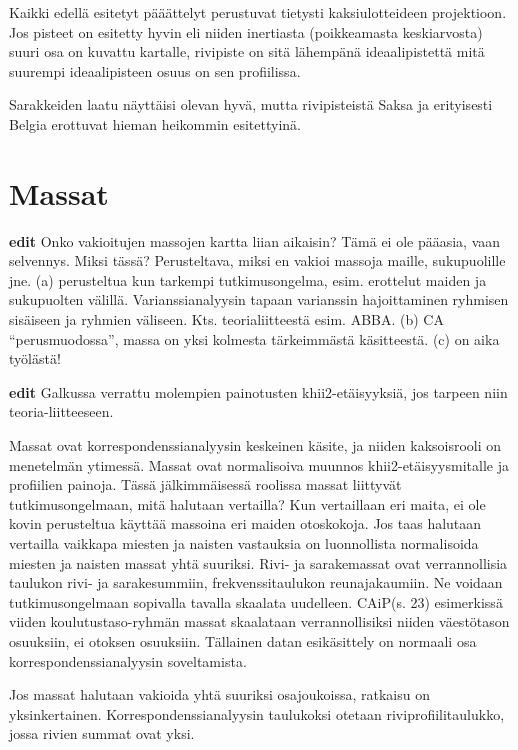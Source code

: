 \documentclass[
  finnish,
]{book}
\begin{document}
Kaikki edellä esitetyt pääättelyt perustuvat tietysti kaksiulotteideen projektioon.
Jos pisteet on esitetty hyvin eli niiden inertiasta (poikkeamasta keskiarvosta)
suuri osa on kuvattu kartalle, rivipiste on sitä lähempänä ideaalipistettä mitä
suurempi ideaalipisteen osuus on sen profiilissa.

Sarakkeiden laatu näyttäisi olevan hyvä, mutta rivipisteistä Saksa ja erityisesti
Belgia erottuvat hieman heikommin esitettyinä.

\hypertarget{massat}{%
\section{Massat}\label{massat}}

\textbf{edit} Onko vakioitujen massojen kartta liian aikaisin? Tämä ei ole pääasia, vaan selvennys.
Miksi tässä? Perusteltava, miksi en vakioi massoja maille, sukupuolille jne. (a)
perusteltua kun tarkempi tutkimusongelma, esim. erottelut maiden ja sukupuolten
välillä. Varianssianalyysin tapaan varianssin hajoittaminen ryhmisen sisäiseen ja
ryhmien väliseen. Kts. teorialiitteestä esim. ABBA. (b) CA ``perusmuodossa'', massa
on yksi kolmesta tärkeimmästä käsitteestä. (c) on aika työlästä!

\textbf{edit} Galkussa verrattu molempien painotusten khii2-etäisyyksiä, jos tarpeen
niin teoria-liitteeseen.

Massat ovat korrespondenssianalyysin keskeinen käsite, ja niiden kaksoisrooli on
menetelmän ytimessä. Massat ovat normalisoiva muunnos khii2-etäisyysmitalle ja
profiilien painoja. Tässä jälkimmäisessä roolissa massat liittyvät tutkimusongelmaan,
mitä halutaan vertailla? Kun vertaillaan eri maita, ei ole kovin perusteltua käyttää
massoina eri maiden otoskokoja. Jos taas halutaan vertailla vaikkapa miesten ja
naisten vastauksia on luonnollista normalisoida miesten ja naisten massat yhtä
suuriksi. Rivi- ja sarakemassat ovat verrannollisia taulukon rivi- ja sarakesummiin,
frekvenssitaulukon reunajakaumiin. Ne voidaan tutkimusongelmaan sopivalla tavalla
skaalata uudelleen. CAiP(s. 23) esimerkissä viiden koulutustaso-ryhmän massat skaalataan
verrannollisiksi niiden väestötason osuuksiin, ei otoksen osuuksiin. Tällainen datan
esikäsittely on normaali osa korrespondenssianalyysin soveltamista.

Jos massat halutaan vakioida yhtä suuriksi osajoukoissa, ratkaisu on yksinkertainen.
Korrespondenssianalyysin taulukoksi otetaan riviprofiilitaulukko, jossa rivien summat
ovat yksi.
\end{document}
